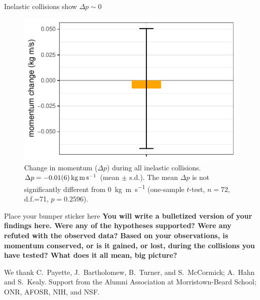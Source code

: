 \documentclass[pdf,serif]{beamer}
\begin{document}
\begin{frame}{}
\begin{columns}[T,totalwidth=\textwidth]
\begin{column}{14.33in}
\begin{minipage}[t][\textheight]{\linewidth}
\begin{block}{Inelastic collisions show $\Delta p\sim 0$}
\begin{figure}
\begin{center}
\includegraphics[width=0.8\columnwidth]{momentum-change.pdf}
\end{center}
\caption{Change in momentum ($\Delta p$) during all inelastic collisions. $\Delta p = \SI{-0.01\pm0.06}{\kilo\gram\meter\per\second}$ (mean $\pm$ s.d.). The mean $\Delta p$ is not significantly different from \SI{0}{\kilo\gram\meter\per\second} (one-sample $t$-test, $n=72$, d.f.=71, $p=0.2596$).}
\label{fig:results2}
\end{figure}
\end{block}
\vfill
\begin{block}{Place your bumper sticker here}
\textbf{You will write a bulletized version of your findings here.  Were any of the hypotheses supported? Were any refuted with the observed data? Based on your observations, is momentum conserved, or is it gained, or lost, during the collisions you have tested? What does it all mean, big picture?}
\end{block}
\vspace{1.25in}
\begin{block}{} %
We thank C.~Payette, J.~Bartholomew, B.~Turner, and S.~McCormick; A.~Hahn and S.~Kealy. Support from the Alumni Association at Morristown-Beard School; ONR, AFOSR, NIH, and NSF.
\end{block}
\vfill*
\end{minipage}
\end{column}
\end{columns}
\end{frame}
\end{document}
